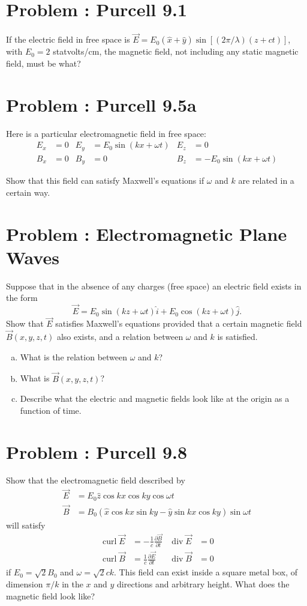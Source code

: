 \documentclass[problems]{esg8022pset}
\DeclareMathOperator{\curl}{curl}
\begin{document}
\section{Problem \thesection: Purcell 9.1}
  If the electric field in free space is $\vec E = E_0(\hat x + \hat y)\sin\left[(2\pi / \lambda)(z + ct)\right]$,
  with $E_0 = 2$ statvolts/cm, the magnetic field, not
  including any static magnetic field, must be what?
\section{Problem \thesection: Purcell 9.5a}
  Here is a particular electromagnetic field in free space:
  \begin{align*}
    E_x & = 0  &
      E_y & = E_0 \sin(kx + \omega t) &
      E_z & = 0 \\
    B_x & = 0 &
      B_y & = 0 &
      B_z & = -E_0\sin(kx + \omega t)
  \end{align*}

  \noindent Show that this field can satisfy Maxwell's equations if $\omega$ and
  $k$ are related in a certain way.
\section{Problem \thesection: Electromagnetic Plane Waves}
  Suppose that in the absence of any charges (free
  space) an electric field exists in the form
  $$\vec E = E_0\sin(kz + \omega t) \hat i + E_0 \cos(kz + \omega t) \hat j.$$
  Show that $\vec E$ satisfies Maxwell's equations provided that a certain magnetic field $\vec B(x,y,z,t)$
  also exists, and a relation between $\omega$ and $k$ is satisfied.
  \begin{enumerate}[(a)]
    \item What is the relation between $\omega$ and $k$?
    \item What is $\vec B(x,y,z,t)$?
    \item Describe what the electric and magnetic fields look like at the origin as a function of
    time.
  \end{enumerate}
\section{Problem \thesection: Purcell 9.8}
  Show that the electromagnetic field described by
  \begin{align*}
    \vec E & = E_0 \hat z \cos kx \cos ky \cos \omega t \\
    \vec B & = B_0(\hat x \cos kx \sin ky - \hat y \sin kx \cos ky) \sin \omega t
  \end{align*}
  will satisfy
  \begin{align*}
    \curl \vec E & = -\frac{1}{c}\frac{\partial \vec B}{\partial t} &
      \operatorname{div}\vec E & = 0 \\
    \curl \vec B & = \frac{1}{c}\frac{\partial \vec E}{\partial t} &
      \operatorname{div}\vec B & = 0
  \end{align*}
  if $E_0 = \sqrt{2}B_0$ and $\omega = \sqrt{2}ck$. This field can exist
  inside a square metal box, of dimension $\pi / k$ in the $x$ and $y$ directions
  and arbitrary height. What does the magnetic field look like?
\end{document}
